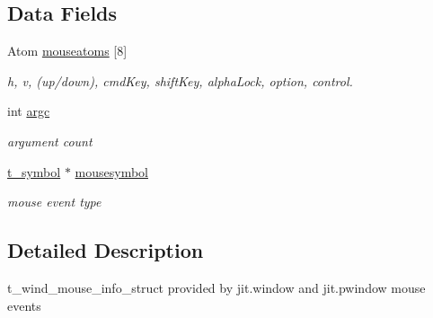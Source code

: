 \subsection*{Data Fields}
\begin{DoxyCompactItemize}
\item 
\hypertarget{structt__wind__mouse__info_adc9080eb87f3646f9a107edbeb2deb8b}{
Atom \hyperlink{structt__wind__mouse__info_adc9080eb87f3646f9a107edbeb2deb8b}{mouseatoms} \mbox{[}8\mbox{]}}
\label{structt__wind__mouse__info_adc9080eb87f3646f9a107edbeb2deb8b}

\begin{DoxyCompactList}\small\item\em h, v, (up/down), cmdKey, shiftKey, alphaLock, option, control. \item\end{DoxyCompactList}\item 
\hypertarget{structt__wind__mouse__info_a6ca3ce85fad8ad945633b185105dca7e}{
int \hyperlink{structt__wind__mouse__info_a6ca3ce85fad8ad945633b185105dca7e}{argc}}
\label{structt__wind__mouse__info_a6ca3ce85fad8ad945633b185105dca7e}

\begin{DoxyCompactList}\small\item\em argument count \item\end{DoxyCompactList}\item 
\hypertarget{structt__wind__mouse__info_a51ce51c1d110626d4fa74a7548cca88f}{
\hyperlink{structt__symbol}{t\_\-symbol} $\ast$ \hyperlink{structt__wind__mouse__info_a51ce51c1d110626d4fa74a7548cca88f}{mousesymbol}}
\label{structt__wind__mouse__info_a51ce51c1d110626d4fa74a7548cca88f}

\begin{DoxyCompactList}\small\item\em mouse event type \item\end{DoxyCompactList}\end{DoxyCompactItemize}


\subsection{Detailed Description}
t\_\-wind\_\-mouse\_\-info\_\-struct provided by jit.window and jit.pwindow mouse events 